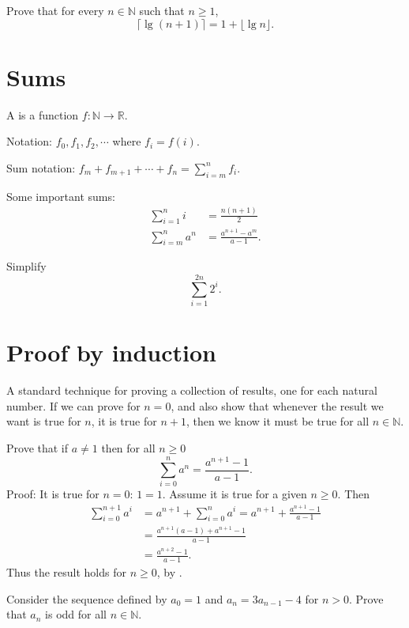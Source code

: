 \begin{Boxample}[4]
Prove that for every $n\in \mathbb{N}$ such that $n\geq 1$,
$$
\lceil \lg (n+1) \rceil = 1 + \lfloor \lg n \rfloor.
$$

\end{Boxample}

\section{Sums}

A  is a function $f:\mathbb{N} \to \mathbb{R}$. 

Notation: $f_0, f_1, f_2, \cdots$ where $f_i = f(i)$.

Sum notation: $f_m+f_{m+1}+\cdots +f_n = \sum_{i=m}^n f_i$.

Some important sums: 
\begin{align*}
\sum_{i=1}^n i & = \frac{n(n+1)}{2} \\
\sum_{i=m}^n a^n&  = \frac{a^{n+1}-a^m}{a-1}.
\end{align*}

\begin{Boxample}[4]
Simplify 
$$
\sum_{i=1}^{2n} 2^i.
$$
\end{Boxample}

\section{Proof by induction}
A standard technique for proving a collection of results, one for each natural number. If we can prove for $n=0$, and also show that whenever the result we want is true for $n$, it is true for $n+1$, then we know it must be true for all $n\in \mathbb{N}$.

\begin{Example}
Prove that if $a\neq 1$ then for all  $n\geq 0$
$$
\sum_{i=0}^n a^n = \frac{a^{n+1} - 1}{a - 1}.
$$
Proof: It is true for $n=0$: $1 = 1$. Assume it is true for a given  $n\geq 0$. Then
\begin{align*}
\sum_{i=0}^{n+1} a^i & = a^{n+1} + \sum_{i=0}^n a^i 
= a^{n+1} + \frac{a^{n+1} - 1}{a-1} \\
& = \frac{a^{n+1} (a - 1) + a^{n+1} - 1}{a-1}\\
& = \frac{a^{n+2} - 1}{a-1}.
\end{align*}
Thus the result holds for  $n\geq 0$, by .
\end{Example}

\begin{Boxample}[4]
Consider the sequence defined by $a_0 = 1$ and $a_n = 3a_{n-1} - 4$ for $n>0$. Prove that $a_n$ is odd for all $n\in \mathbb{N}$.

\end{Boxample}

